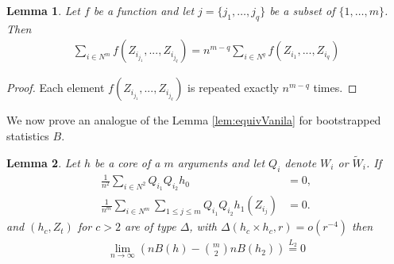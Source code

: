 \documentclass{article} %
\newtheorem{lemma}{Lemma}
\begin{document}
\begin{lemma}
\label{lem:summingLema}
Let $f$ be a  function and let $j=\{j_1,\ldots,j_q\}$ be a subset of $\{1,\ldots,m\}$. Then
\begin{align*}
\sum_{i \in N^m} f(Z_{i_{j_1}},...,Z_{i_{j_q}})= n^{m-q} \sum_{i \in N^q} f(Z_{i_1},...,Z_{i_q})
\end{align*}
\end{lemma}
\begin{proof}
 Each element $f(Z_{i_{j_1}},...,Z_{i_{j_q}})$ is repeated exactly $n^{m-q}$ times.
\end{proof}


We now prove an analogue of the Lemma \ref{lem:equivVanila} for bootstrapped statistics $B$.


\begin{lemma}
\label{lem:equivBoot}
Let $h$ be a core of a $m$ arguments and let $Q_i$ denote  $W_i$ or  $\tilde W_i$. If  
\begin{align*}
\frac{1} {n^2}  \sum_{i \in N^2}   Q_{i_1} Q_{i_2} h_0 &=0, \\
\frac{1} {n^m}  \sum_{i \in N^m}  \sum_{1 \leq j \leq m } Q_{i_1} Q_{i_2} h_1(Z_{i_j}) &=0.
\end{align*}
and $(h_c,Z_{t})$ for $c>2$  are  of type $\varDelta$, with $\varDelta(h_c \times h_c,r) = o( r^{-4})$ then    
\begin{align*}
  \lim_{n \to \infty} \left( n B(h) -  \binom m 2  n B(h_2)  \right) \overset{L_2}{=} 0
\end{align*}
\end{lemma}
\end{document}
